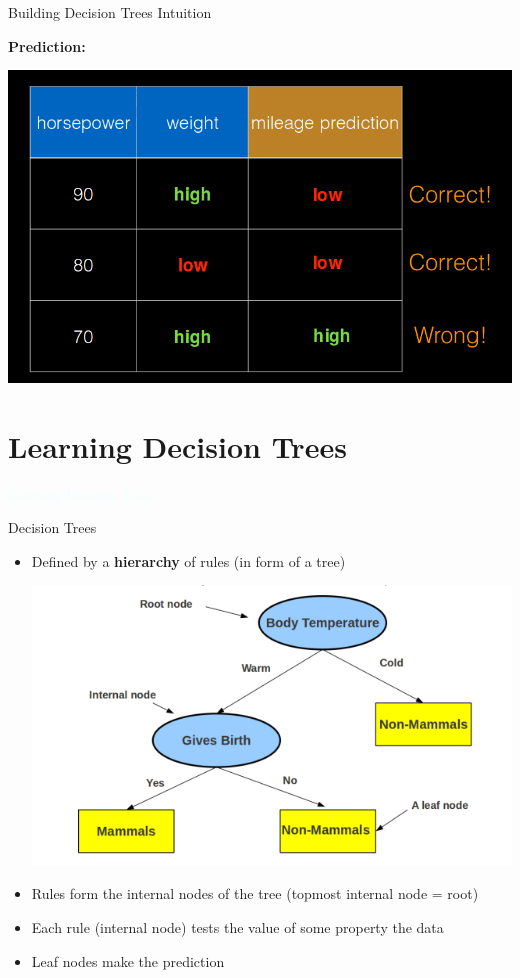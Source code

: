 \documentclass{beamer}
\newcommand{\thblue}[1]{{\Huge {\textcolor{azure}{#1}}}}
\begin{document}
\begin{frame}{Building Decision Trees Intuition}

    {\bf Prediction:}
    \begin{center}
        \includegraphics[scale=0.3]{dTreeEg5.png}
    \end{center}
\end{frame}


\section{Learning Decision Trees}
\begin{frame}{} 
    \begin{center}
        \thblue{Learning Decision Trees}
    \end{center}
\end{frame}

\begin{frame}{Decision Trees}
    \begin{itemize}
        \item Defined by a {\bf hierarchy} of rules (in form of a tree)
            \begin{center}
                \includegraphics[scale=0.3]{dTreeExpl.png}
            \end{center}
        \item Rules form the internal nodes of the tree (topmost internal node = root)
        \item Each rule (internal node) tests the value of some property the data
        \item Leaf nodes make the prediction
    \end{itemize}
\end{frame}
\end{document}
